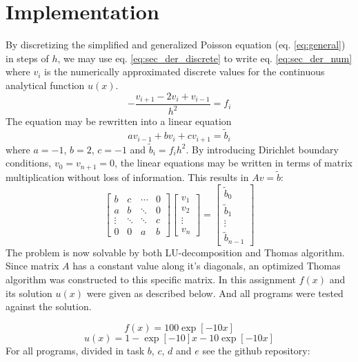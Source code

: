 \documentclass[twoside,twocolumn]{article}
\begin{document}
\section{Implementation}
By discretizing the simplified and generalized Poisson equation (eq. \ref{eq:general}) in steps of $h$, we may use eq. \ref{eq:sec_der_discrete} to write eq. \ref{eq:sec_der_num} where $v_i$ is the numerically approximated discrete values for the continuous analytical function $u(x)$.
\begin{equation}
-\frac{v_{i+1}-2v_i+v_{i-1}}{h^2}=f_i \label{eq:sec_der_num}
\end{equation}
The equation may be rewritten into a linear equation
\begin{equation*}
av_{i-1}+bv_i+cv_{i+1}=\tilde{b}_i 
\end{equation*}
where $a=-1$, $b=2$, $c=-1$ and $\tilde{b}_i=f_ih^2$. By introducing Dirichlet boundary conditions, $v_0=v_{n+1}=0$, the linear equations may be written in terms of matrix multiplication without loss of information. This results in $Av=\tilde{b}$:
\begin{equation}
\begin{bmatrix}
b&c&\cdots &0\\
a&b&\ddots & 0\\
\vdots&\ddots&\ddots&c\\
0&0&a&b
\end{bmatrix}
\begin{bmatrix}
v_1\\v_2\\\vdots\\v_{n}
\end{bmatrix}=
\begin{bmatrix}
\tilde{b}_0\\\tilde{b}_1\\\vdots\\\tilde{b}_{n-1}
\end{bmatrix} \label{eq:problem}
\end{equation}
\newpage
The problem is now solvable by both LU-decomposition and Thomas algorithm. Since matrix $A$ has a constant value along it's diagonals, an optimized Thomas algorithm was constructed to this specific matrix.
In this assignment $f(x)$ and its solution $u(x)$ were given as described below. And all programs were tested against the solution.

\begin{equation*}
f(x)=100\exp[-10x]
\end{equation*}
\begin{equation*}
u(x)=1-\exp[-10]x-10\exp[-10x]
\end{equation*}
For all programs, divided in task $b$, $c$, $d$ and $e$ see the github repository: 
\end{document}
